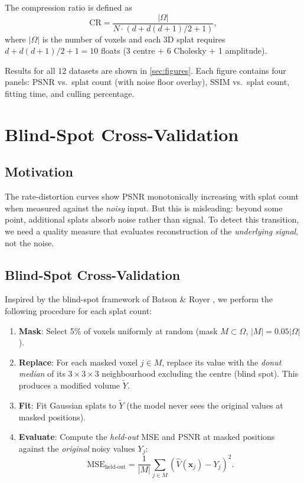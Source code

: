 \documentclass[11pt, a4paper]{article}
\theoremstyle{plain}
\theoremstyle{definition}
\theoremstyle{remark}
\newcommand{\bx}{\bm{x}}
\newcommand{\MSE}{\mathrm{MSE}}
\begin{document}
The compression ratio is defined as
\begin{equation}
  \text{CR} = \frac{|\Omega|}{N \cdot (d + d(d+1)/2 + 1)},
\end{equation}
where $|\Omega|$ is the number of voxels and each 3D splat requires
$d + d(d+1)/2 + 1 = 10$ floats (3 centre + 6 Cholesky + 1 amplitude).

Results for all 12 datasets are shown in \cref{sec:figures}. Each
figure contains four panels: PSNR vs.\ splat count (with noise floor
overlay), SSIM vs.\ splat count, fitting time, and culling percentage.


\section{Blind-Spot Cross-Validation}
\label{sec:noise2self} %

\subsection{Motivation}
\label{sec:n2s-motivation}

The rate-distortion curves show PSNR monotonically increasing with splat
count when measured against the \emph{noisy} input. But this is misleading:
beyond some point, additional splats absorb noise rather than signal.
To detect this transition, we need a quality measure that evaluates
reconstruction of the \emph{underlying signal}, not the noise.

\subsection{Blind-Spot Cross-Validation}
\label{sec:n2s-method}

Inspired by the blind-spot framework of Batson \& Royer \citep{batson2019noise2self}, we
perform the following procedure for each splat count:

\begin{enumerate}
  \item \textbf{Mask}: Select 5\% of voxels uniformly at random
    (mask $M \subset \Omega$, $|M| = 0.05|\Omega|$).
  \item \textbf{Replace}: For each masked voxel $j \in M$, replace its
    value with the \emph{donut median} of its $3\times3\times3$
    neighbourhood excluding the centre (blind spot). This produces
    a modified volume $\tilde{Y}$.
  \item \textbf{Fit}: Fit Gaussian splats to $\tilde{Y}$ (the model
    never sees the original values at masked positions).
  \item \textbf{Evaluate}: Compute the \emph{held-out} MSE and PSNR
    at masked positions against the \emph{original} noisy values $Y_j$:
    \begin{equation}
      \MSE_{\text{held-out}} = \frac{1}{|M|}
        \sum_{j \in M} \left(\hat{V}(\bx_j) - Y_j\right)^2.
    \end{equation}
\end{enumerate}
\end{document}
